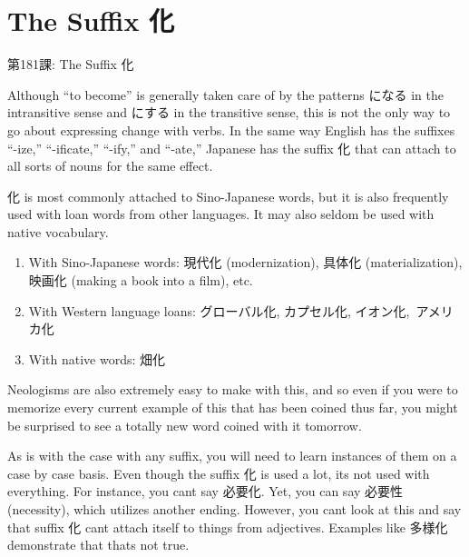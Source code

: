     
\chapter{The Suffix 化}

\begin{center}
\begin{Large}
第181課: The Suffix 化 
\end{Large}
\end{center}
 
\par{ Although “to become” is generally taken care of by the patterns になる in the intransitive sense and にする in the transitive sense, this is not the only way to go about expressing change with verbs. In the same way English has the suffixes “-ize,” “-ificate,” “-ify,” and “-ate,” Japanese has the suffix 化 that can attach to all sorts of nouns for the same effect. }

\par{ 化 is most commonly attached to Sino-Japanese words, but it is also frequently used with loan words from other languages. It may also seldom be used with native vocabulary. }

\begin{enumerate}

\item With Sino-Japanese words: 現代化 (modernization), 具体化 (materialization), 映画化 (making a book into a film), etc. \hfill\break

\item With Western language loans: グローバル化, カプセル化, イオン化, アメリカ化 \hfill\break

\item With native words: 畑化 
\end{enumerate}

\par{ Neologisms are also extremely easy to make with this, and so even if you were to memorize every current example of this that has been coined thus far, you might be surprised to see a totally new word coined with it tomorrow. }

\par{ As is with the case with any suffix, you will need to learn instances of them on a case by case basis. Even though the suffix 化 is used a lot, it\textquotesingle s not used with everything. For instance, you can\textquotesingle t say 必要化. Yet, you can say 必要性 (necessity), which utilizes another ending. However, you can\textquotesingle t look at this and say that suffix 化 can\textquotesingle t attach itself to things from adjectives. Examples like 多様化 demonstrate that that\textquotesingle s not true. }

